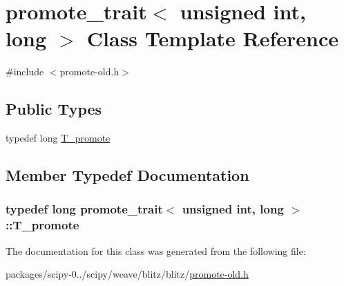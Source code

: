 \hypertarget{classpromote__trait_3_01unsigned_01int_00_01long_01_4}{}\section{promote\+\_\+trait$<$ unsigned int, long $>$ Class Template Reference}
\label{classpromote__trait_3_01unsigned_01int_00_01long_01_4}


{\ttfamily \#include $<$promote-\/old.\+h$>$}

\subsection*{Public Types}
\begin{DoxyCompactItemize}
\item 
typedef long \hyperlink{classpromote__trait_3_01unsigned_01int_00_01long_01_4_a9b7d35063cb8fafcfa5b5dc86d5f2ddf}{T\+\_\+promote}
\end{DoxyCompactItemize}


\subsection{Member Typedef Documentation}
\hypertarget{classpromote__trait_3_01unsigned_01int_00_01long_01_4_a9b7d35063cb8fafcfa5b5dc86d5f2ddf}{}
\subsubsection[{T\+\_\+promote}]{\setlength{\rightskip}{0pt plus 5cm}typedef long {\bf promote\+\_\+trait}$<$ unsigned int, long $>$\+::{\bf T\+\_\+promote}}\label{classpromote__trait_3_01unsigned_01int_00_01long_01_4_a9b7d35063cb8fafcfa5b5dc86d5f2ddf}


The documentation for this class was generated from the following file\+:\begin{DoxyCompactItemize}
\item 
packages/scipy-\/0../scipy/weave/blitz/blitz/\hyperlink{promote-old_8h}{promote-\/old.\+h}\end{DoxyCompactItemize}
